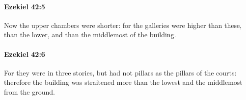 		\paragraph{Ezekiel 42:5} %
			\label{EZEKIEL-42-5}

			Now the upper chambers were shorter: for the galleries were higher than these, than the lower, and than the middlemost of the building.


		\paragraph{Ezekiel 42:6} %
			\label{EZEKIEL-42-6}

			For they were in three stories, but had not pillars as the pillars of the courts: therefore the building was straitened more than the lowest and the middlemost from the ground.


